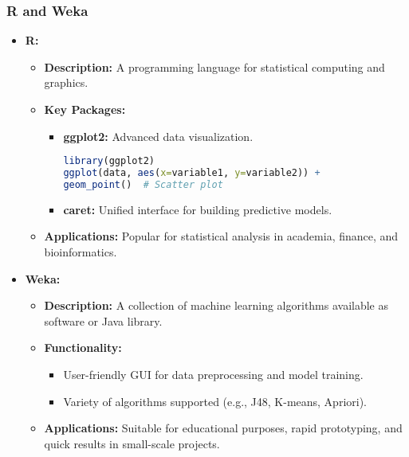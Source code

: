 \documentclass[aspectratio=169]{beamer}
\begin{document}
\begin{frame}[fragile]
    \frametitle{R and Weka}
    \begin{itemize}
        \item \textbf{R:}
        \begin{itemize}
            \item \textbf{Description:} A programming language for statistical computing and graphics.
            \item \textbf{Key Packages:}
            \begin{itemize}
                \item \textbf{ggplot2:} Advanced data visualization.
                \begin{lstlisting}[language=R]
library(ggplot2)
ggplot(data, aes(x=variable1, y=variable2)) + 
geom_point()  # Scatter plot
                \end{lstlisting}
                \item \textbf{caret:} Unified interface for building predictive models.
            \end{itemize}
            \item \textbf{Applications:} Popular for statistical analysis in academia, finance, and bioinformatics.
        \end{itemize}
    
        \item \textbf{Weka:}
        \begin{itemize}
            \item \textbf{Description:} A collection of machine learning algorithms available as software or Java library.
            \item \textbf{Functionality:}
            \begin{itemize}
                \item User-friendly GUI for data preprocessing and model training.
                \item Variety of algorithms supported (e.g., J48, K-means, Apriori).
            \end{itemize}
            \item \textbf{Applications:} Suitable for educational purposes, rapid prototyping, and quick results in small-scale projects.
        \end{itemize}
    \end{itemize}
\end{frame}
\end{document}

